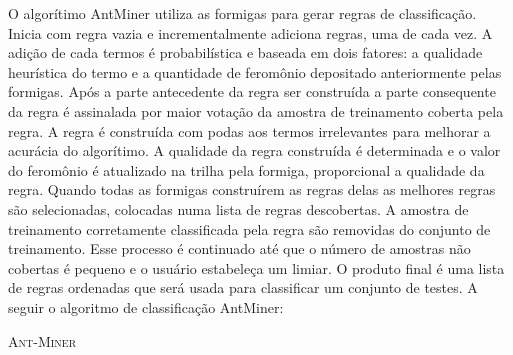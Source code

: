 \documentclass[conference,compsoc]{IEEEtran}
\begin{document}
O algorítimo AntMiner utiliza as formigas para gerar regras de classificação. Inicia com regra vazia e incrementalmente adiciona regras, uma de cada vez. A adição de cada termos é probabilística e baseada em dois fatores: a qualidade heurística do termo e a quantidade de feromônio depositado anteriormente pelas formigas. Após a parte antecedente da regra ser construída a parte consequente da regra é assinalada por maior votação da amostra de treinamento coberta pela regra. A regra é construída com podas aos termos irrelevantes para melhorar a acurácia do algorítimo. A qualidade da regra construída é determinada e o valor do feromônio é atualizado na trilha pela formiga, proporcional a qualidade da regra. Quando todas as formigas construírem as regras delas as melhores regras são selecionadas, colocadas numa lista de regras descobertas. A amostra de treinamento corretamente classificada pela regra são removidas do conjunto de treinamento. Esse processo é continuado até que o número de amostras não cobertas é pequeno e o usuário estabeleça um limiar. O produto final é uma lista de regras ordenadas que será usada para classificar um conjunto de testes. A seguir o algoritmo de classificação AntMiner:

\begin{algorithm}
	\SetAlgoLined
   \label{alg1}
   \caption{\textsc{Ant-Miner}}
\end{algorithm}
\end{document}
